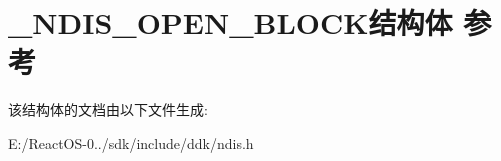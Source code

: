 \hypertarget{struct___n_d_i_s___o_p_e_n___b_l_o_c_k}{}\section{\+\_\+\+N\+D\+I\+S\+\_\+\+O\+P\+E\+N\+\_\+\+B\+L\+O\+C\+K结构体 参考}
\label{struct___n_d_i_s___o_p_e_n___b_l_o_c_k}


该结构体的文档由以下文件生成\+:\begin{DoxyCompactItemize}
\item 
E\+:/\+React\+O\+S-\/0../sdk/include/ddk/ndis.\+h\end{DoxyCompactItemize}
